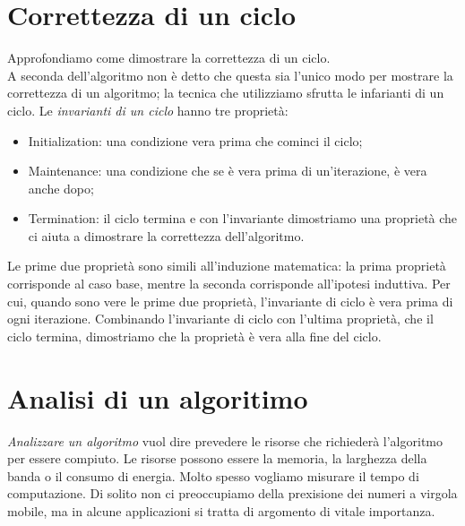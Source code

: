 \documentclass{article}
\begin{document}
\section{Correttezza di un ciclo}
Approfondiamo come dimostrare la correttezza di un ciclo.\\
A seconda dell'algoritmo non è detto che questa sia l'unico modo per mostrare la
correttezza di un algoritmo; la tecnica che utilizziamo sfrutta le infarianti di
un ciclo. Le \textit{invarianti di un ciclo} hanno tre proprietà:
\begin{itemize}
    \item Initialization: una condizione vera prima che cominci il ciclo;
    \item Maintenance: una condizione che se è vera prima di un'iterazione, è
        vera anche dopo;
    \item Termination: il ciclo termina e con l'invariante dimostriamo una
        proprietà che ci aiuta a dimostrare la correttezza dell'algoritmo.
\end{itemize}

Le prime due proprietà sono simili all'induzione matematica: la prima proprietà
corrisponde al caso base, mentre la seconda corrisponde all'ipotesi induttiva. Per cui, quando
sono vere le prime due proprietà, l'invariante di ciclo è vera prima di ogni
iterazione. Combinando l'invariante di ciclo con l'ultima proprietà, che il
ciclo termina, dimostriamo che la proprietà è vera alla fine del ciclo.

\section{Analisi di un algoritimo}
\textit{Analizzare un algoritmo} vuol dire prevedere le risorse che richiederà
l'algoritmo per essere compiuto. Le risorse possono essere la memoria, la
larghezza della banda o il consumo di energia. Molto spesso vogliamo misurare il
tempo di computazione. Di solito non ci preoccupiamo della prexisione dei numeri
a virgola mobile, ma in alcune applicazioni si tratta di argomento di vitale
importanza.\\
\end{document}
